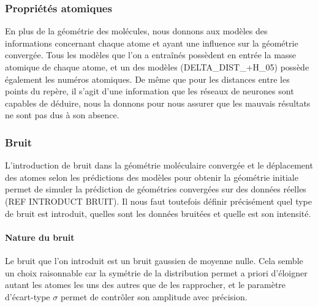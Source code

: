 \subsubsection{Propriétés atomiques}
\par En plus de la géométrie des molécules, nous donnons aux modèles des informations concernant chaque atome et ayant une influence sur la géométrie convergée. Tous les modèles que l'on a entraînés possèdent en entrée la masse atomique de chaque atome, et un des modèles (DELTA\_DIST\_+H\_05) possède également les numéros atomiques. De même que pour les distances entre les points du repère, il s'agit d'une information que les réseaux de neurones sont capables de déduire, nous la donnons pour nous assurer que les mauvais résultats ne sont pas dus à son absence.

\subsubsection{Bruit}
\par L'introduction de bruit dans la géométrie moléculaire convergée et le déplacement des atomes selon les prédictions des modèles pour obtenir la géométrie initiale permet de simuler la prédiction de géométries convergées sur des données réelles (REF INTRODUCT BRUIT). Il nous faut toutefois définir précisément quel type de bruit est introduit, quelles sont les données bruitées et quelle est son intensité.\\

\paragraph{Nature du bruit} Le bruit que l'on introduit est un bruit gaussien de moyenne nulle. Cela semble un choix raisonnable car la symétrie de la distribution permet a priori d'éloigner autant les atomes les uns des autres que de les rapprocher, et le paramètre d'écart-type $\sigma$ permet de contrôler son amplitude avec précision.\\

